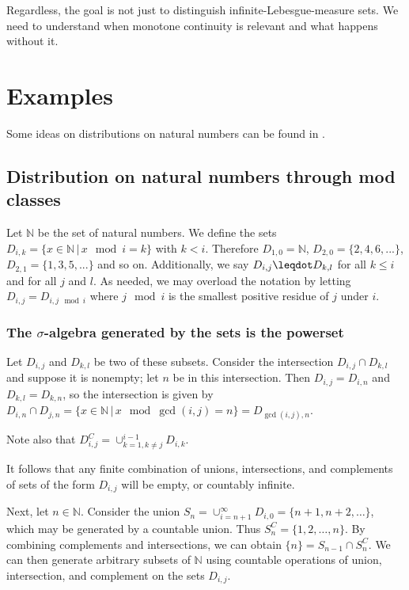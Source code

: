 \documentclass[10pt, onecolumn, longbibliography, nofootinbib]{revtex4-2}
\begin{document}
Regardless, the goal is not just to distinguish infinite-Lebesgue-measure sets. We need to understand when monotone continuity is relevant and what happens without it. 

\section{Examples}

Some ideas on distributions on natural numbers can be found in \cite{Schirokauer2007}.

\subsection{Distribution on natural numbers through mod classes}

Let $\mathbb{N}$ be the set of natural numbers. We define the sets $D_{i,k} = \{ x \in \mathbb{N} \, | \, x \mod i = k \}$ with $k < i$. Therefore $D_{1,0} = \mathbb{N}$, $D_{2,0} = \{ 2, 4, 6, ... \}$, $D_{2,1} = \{ 1, 3, 5, ... \}$ and so on. Additionally, we say $D_{i,j} \finer D_{k,l}$ for all $k \leq i$ and for all $j$ and $l$. As needed, we may overload the notation by letting $D_{i,j} =  D_{i, j \mod i}$ where $j\mod i$ is the smallest positive residue of $j$ under $i$.

\subsubsection{The $\sigma$-algebra generated by the sets is the powerset}

Let $D_{i,j}$ and $D_{k,l}$ be two of these subsets. Consider the intersection $D_{i,j}\cap D_{k,l}$ and suppose it is nonempty; let $n$ be in this intersection. Then $D_{i,j} = D_{i,n}$ and $D_{k,l} = D_{k,n}$, so the intersection is given by $D_{i,n}\cap D_{j,n} = \{x\in \mathbb{N} \, | \, x \mod \gcd(i,j) = n\} = D_{\gcd(i,j),n}$. 

Note also that $D_{i,j}^C = \cup_{k=1,k\neq j}^{i-1}D_{i,k}$. 

It follows that any finite combination of unions, intersections, and complements of sets of the form $D_{i,j}$ will be empty, or countably infinite. 

Next, let $n\in\mathbb{N}$. Consider the union $S_n = \cup_{i=n+1}^{\infty}D_{i,0} = \{n+1,n+2,\ldots\}$, which may be generated by a countable union. Thus $S_n^C = \{1,2,\ldots,n\}$. By combining complements and intersections, we can obtain $\{n\} = S_{n-1}\cap S_n^C$. We can then generate arbitrary subsets of $\mathbb{N}$ using countable operations of union, intersection, and complement on the sets $D_{i,j}$. 
\end{document}

